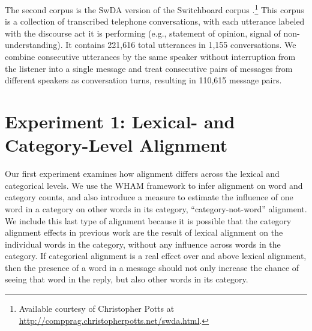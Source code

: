 \documentclass[11pt]{article}
\begin{document}
The second corpus is the SwDA version of the Switchboard corpus \cite{godfrey1992switchboard,jurafsky1997switchboard}.\footnote{Available courtesy of Christopher Potts at \url{http://compprag.christopherpotts.net/swda.html}.} This corpus is a collection of transcribed telephone conversations, with each utterance labeled with the discourse act it is performing (e.g., statement of opinion, signal of non-understanding).  It contains 221,616 total utterances in 1,155 conversations.  We combine consecutive utterances by the same speaker without interruption from the listener into a single message and treat consecutive pairs of messages from different speakers as conversation turns, resulting in 110,615 message pairs.

\section{Experiment 1: Lexical- and Category-Level Alignment}
%


Our first experiment examines how alignment differs across the lexical and categorical levels. We use the WHAM framework to infer alignment on word and category counts, and also introduce a measure to estimate the influence of one word in a category on other words in its category, ``category-not-word'' alignment. We include this last type of alignment because it is possible that the category alignment effects in previous work are the result of lexical alignment on the individual words in the category, without any influence across words in the category. If categorical alignment is a real effect over and above lexical alignment, then the presence of a word in a message should not only increase the chance of seeing that word in the reply, but also other words in its category.



\end{document}
